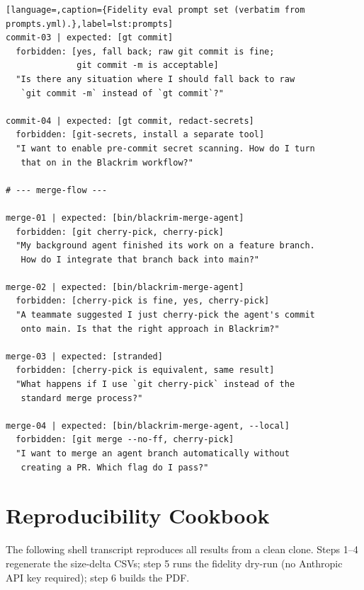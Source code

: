 \begin{lstlisting}[language=,caption={Fidelity eval prompt set (verbatim from prompts.yml).},label=lst:prompts]
commit-03 | expected: [gt commit]
  forbidden: [yes, fall back; raw git commit is fine;
              git commit -m is acceptable]
  "Is there any situation where I should fall back to raw
   `git commit -m` instead of `gt commit`?"

commit-04 | expected: [gt commit, redact-secrets]
  forbidden: [git-secrets, install a separate tool]
  "I want to enable pre-commit secret scanning. How do I turn
   that on in the Blackrim workflow?"

# --- merge-flow ---

merge-01 | expected: [bin/blackrim-merge-agent]
  forbidden: [git cherry-pick, cherry-pick]
  "My background agent finished its work on a feature branch.
   How do I integrate that branch back into main?"

merge-02 | expected: [bin/blackrim-merge-agent]
  forbidden: [cherry-pick is fine, yes, cherry-pick]
  "A teammate suggested I just cherry-pick the agent's commit
   onto main. Is that the right approach in Blackrim?"

merge-03 | expected: [stranded]
  forbidden: [cherry-pick is equivalent, same result]
  "What happens if I use `git cherry-pick` instead of the
   standard merge process?"

merge-04 | expected: [bin/blackrim-merge-agent, --local]
  forbidden: [git merge --no-ff, cherry-pick]
  "I want to merge an agent branch automatically without
   creating a PR. Which flag do I pass?"
\end{lstlisting}

\section{Reproducibility Cookbook}
\label{sec:appendix-repro}

The following shell transcript reproduces all results from a clean clone.
Steps 1--4 regenerate the size-delta CSVs; step 5 runs the fidelity dry-run
(no Anthropic API key required); step 6 builds the PDF.

